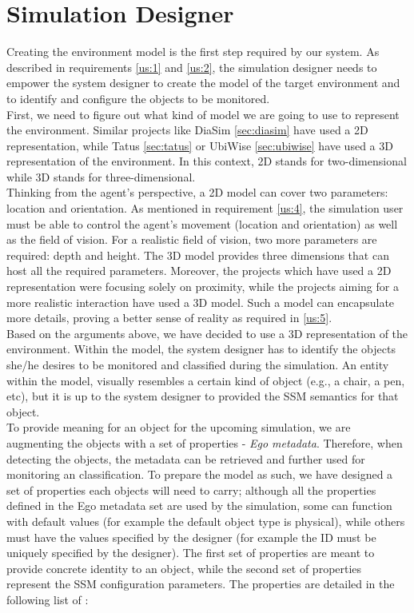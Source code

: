\section{Simulation Designer} %
\label{sec:simulation_designer}
Creating the environment model is the first step required by our system. As described in requirements \ref{us:1} and \ref{us:2}, the simulation designer needs to empower the system designer to create the model of the target environment and to identify and configure the objects to be monitored.\\

First, we need to figure out what kind of model we are going to use to represent the environment. Similar projects like DiaSim \ref{sec:diasim} have used a 2D representation, while Tatus \ref{sec:tatus} or UbiWise \ref{sec:ubiwise} have used a 3D representation of the environment. In this context, 2D stands for two-dimensional while 3D stands for three-dimensional.\\

Thinking from the agent's perspective, a 2D model can cover two parameters: location and orientation. As mentioned in requirement \ref{us:4}, the simulation user must be able to control the agent's movement (location and orientation) as well as the field of vision. For a realistic field of vision, two more parameters are required: depth and height. The 3D model provides three dimensions that can host all the required parameters. Moreover, the projects which have used a 2D representation were focusing solely on proximity, while the projects aiming for a more realistic interaction have used a 3D model. Such a model can encapsulate more details, proving a better sense of reality as required in \ref{us:5}.\\

Based on the arguments above, we have decided to use a 3D representation of the environment. Within the model, the system designer has to identify the objects she/he desires to be monitored and classified during the simulation. An entity within the model, visually resembles a certain kind of object (e.g., a chair, a pen, etc), but it is up to the system designer to provided the SSM semantics for that object.\\

To provide meaning for an object for the upcoming simulation, we are augmenting the objects with a set of properties - \emph{Ego metadata}. Therefore, when detecting the objects, the metadata can be retrieved and further used for monitoring an classification. To prepare the model as such, we have designed a set of properties each objects will need to carry; although all the properties defined in the Ego metadata set are used by the simulation, some can function with default values (for example the default object type is physical), while others must have the values specified by the designer (for example the ID must be uniquely specified by the designer). The first set of properties are meant to provide concrete identity to an object, while the second set of properties represent the SSM configuration parameters. The properties are detailed in the following list of :
